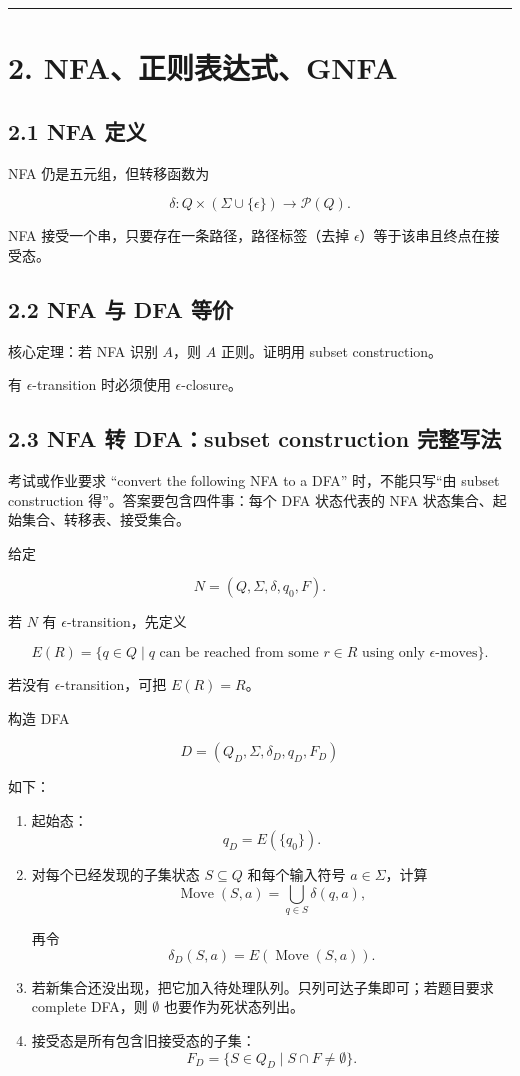 ﻿\documentclass[UTF8,11pt]{ctexart}
\begin{document}
\bigskip\hrule\bigskip


\section{2. NFA、正则表达式、GNFA}


\subsection{2.1 NFA 定义}


NFA 仍是五元组，但转移函数为

\[
\delta:Q\times(\Sigma\cup\{\epsilon\})\to\mathcal P(Q).
\]

NFA 接受一个串，只要存在一条路径，路径标签（去掉 \(\epsilon\)）等于该串且终点在接受态。


\subsection{2.2 NFA 与 DFA 等价}


核心定理：若 NFA 识别 \(A\)，则 \(A\) 正则。证明用 subset construction。  

有 \(\epsilon\)-transition 时必须使用 \(\epsilon\)-closure。


\subsection{2.3 NFA 转 DFA：subset construction 完整写法}


考试或作业要求 “convert the following NFA to a DFA” 时，不能只写“由 subset construction 得”。答案要包含四件事：每个 DFA 状态代表的 NFA 状态集合、起始集合、转移表、接受集合。


给定

\[
N=(Q,\Sigma,\delta,q_0,F).
\]

若 \(N\) 有 \(\epsilon\)-transition，先定义

\[
E(R)=\{q\in Q\mid q\text{ can be reached from some }r\in R\text{ using only }\epsilon\text{-moves}\}.
\]

若没有 \(\epsilon\)-transition，可把 \(E(R)=R\)。


构造 DFA

\[
D=(Q_D,\Sigma,\delta_D,q_D,F_D)
\]

如下：


\begin{enumerate}
\item 起始态：
\[
   q_D=E(\{q_0\}).
   \]

\item 对每个已经发现的子集状态 \(S\subseteq Q\) 和每个输入符号 \(a\in\Sigma\)，计算
\[
   \operatorname{Move}(S,a)=\bigcup_{q\in S}\delta(q,a),
   \]

再令
\[
   \delta_D(S,a)=E(\operatorname{Move}(S,a)).
   \]

\item 若新集合还没出现，把它加入待处理队列。只列可达子集即可；若题目要求 complete DFA，则 \(\emptyset\) 也要作为死状态列出。
\item 接受态是所有包含旧接受态的子集：
\[
   F_D=\{S\in Q_D\mid S\cap F\neq\emptyset\}.
   \]

\end{enumerate}
\end{document}

